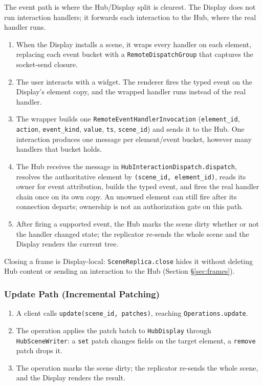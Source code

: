 \documentclass[a4paper,10pt]{article}
\newcommand{\tool}[1]{\texttt{#1}}
\newcommand{\msg}[1]{\texttt{#1}}
\newcommand{\field}[1]{\texttt{#1}}
\begin{document}
The event path is where the Hub/Display split is clearest.  The Display
does not run interaction handlers; it forwards each interaction to the Hub,
where the real handler runs.

\begin{enumerate}
  \item When the Display installs a scene, it wraps every handler on each
    element, replacing each event bucket with a
    \texttt{RemoteDispatchGroup} that captures the socket-send closure.
  \item The user interacts with a widget.  The renderer fires the typed
    event on the Display's element copy, and the wrapped handler runs
    instead of the real handler.
  \item The wrapper builds one \msg{RemoteEventHandlerInvocation}
    (\field{element\_id}, \field{action}, \field{event\_kind},
    \field{value}, \field{ts}, \field{scene\_id}) and sends it to the Hub.
    One interaction produces one message per element/event bucket, however
    many handlers that bucket holds.
  \item The Hub receives the message in \texttt{HubInteractionDispatch.dispatch},
    resolves the authoritative element by \field{(scene\_id, element\_id)},
    reads its owner for event attribution, builds the typed event, and fires
    the real handler chain once on its own copy. An unowned element can still
    fire after its connection departs; ownership is not an authorization
    gate on this path.
  \item After firing a supported event, the Hub marks the scene dirty
    whether or not the handler changed state; the replicator re-sends the
    whole scene and the Display renders the current tree.
\end{enumerate}

Closing a frame is Display-local: \texttt{SceneReplica.close} hides it
without deleting Hub content or sending an interaction to the Hub
(Section \S\ref{sec:frames}).

\subsubsection{Update Path (Incremental Patching)}

\begin{enumerate}
  \item A client calls \tool{update(scene\_id, patches)}, reaching
    \texttt{Operations.update}.
  \item The operation applies the patch batch to \texttt{HubDisplay}
    through \texttt{HubSceneWriter}: a \field{set} patch changes fields on
    the target element, a \field{remove} patch drops it.
  \item The operation marks the scene dirty; the replicator re-sends the
    whole scene, and the Display renders the result.
\end{enumerate}
\end{document}

